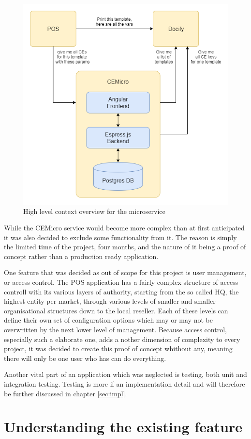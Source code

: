 \begin{figure}
  \centering
  \includegraphics[width=0.6\linewidth]{assets/high-level-overview.png}
  \caption{High level context overview for the microservice}
  \label{fig:context}
\end{figure}

While the CEMicro service would become more complex than at first anticipated it was also decided to exclude some functionality from it. The reason is simply the limited time of the project, four months, and the nature of it being a proof of concept rather than a production ready application.

One feature that was decided as out of scope for this project is user management, or access control. The POS application has a fairly complex structure of access controll with its various layers of authority, starting from the so called HQ, the highest entity per market, through various levels of smaller and smaller organisational structures down to the local reseller. Each of these levels can define their own set of configuration options which may or may not be overwritten by the next lower level of management. Because access control, especially such a elaborate one, adds a nother dimension of complexity to every project, it was decided to create this proof of concept whithout any, meaning there will only be one user who has can do everything.

Another vital part of an application which was neglected is testing, both unit and integration testing. Testing is more if an implementation detail and will therefore be further discussed in chapter \ref{sec:impl}.


\section{Understanding the existing feature}

